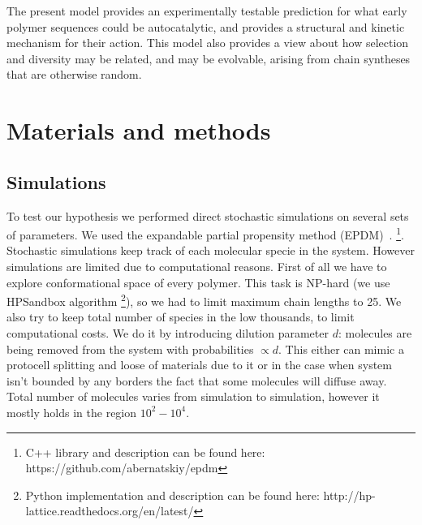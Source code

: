 \documentclass[journal=jacsat,manuscript=article,layout=twocolumn]{achemso}
\begin{document}
  The present model provides an experimentally testable prediction for what early 
  polymer sequences could be autocatalytic, and provides a structural and kinetic mechanism for 
their action.  This model also provides a view about how selection and diversity may be related, 
and may be evolvable, arising from chain syntheses that are otherwise random.



\section{Materials and methods}\label{sec:mat}
\subsection{Simulations}\label{sec:mat-sim}
To test our hypothesis we performed direct stochastic simulations on several sets of parameters. 
We 
used the expandable partial propensity method (EPDM)~\cite{Guseva2016b}.
\footnote{C++ library and description can be found here: https://github.com/abernatskiy/epdm}. 
Stochastic simulations keep track of each 
molecular specie in the system. However simulations are limited due to computational reasons. 
First of all we have to explore conformational space of every polymer. This task is NP-hard (we 
use 
HPSandbox algorithm\cite{lau1989lattice,Dill2008} \footnote{Python implementation and description 
can be found here: http://hp-lattice.readthedocs.org/en/latest/}), so we had to limit 
maximum chain lengths to 25. We also try to keep total number of species in the low thousands, to 
limit computational costs. We do it by introducing dilution parameter $d$: molecules are being 
removed from the system with probabilities $\propto d$. 
This either can mimic a protocell splitting and loose of materials due to it or in the case when 
system isn't bounded by any borders the fact that some molecules will diffuse away. Total number 
of 
molecules varies from simulation to simulation, 
however it mostly holds in the region $10^2-10^4$.
\end{document}
